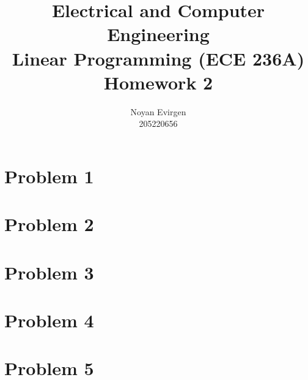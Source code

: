 \documentclass[]{report}
\title{Electrical and Computer Engineering \\
	Linear Programming (ECE 236A)\\
	Homework 2
}
\author{Noyan Evirgen \\	
	205220656}
\begin{document}
	\maketitle
	
	\chapter{Problem 1}
	
	\chapter{Problem 2}
	
	\chapter{Problem 3}
	
	\chapter{Problem 4}
	
	\chapter{Problem 5}
\end{document}
